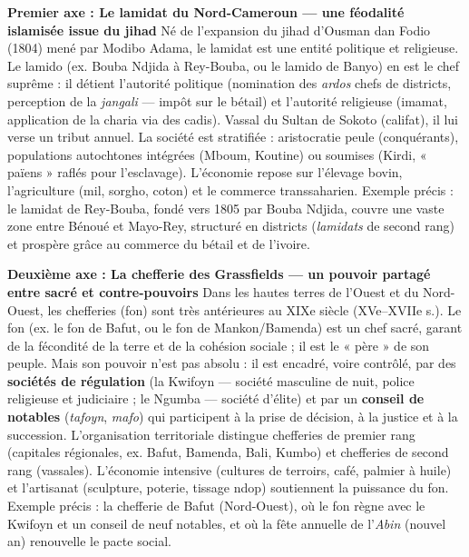 \documentclass[11pt]{article}
\newcommand{\cle}[1]{{\popxbold\color{popdark}#1}}
\begin{document}
\begin{corrige}
\textbf{Premier axe : Le lamidat du Nord-Cameroun — une féodalité islamisée issue du jihad}
Né de l'expansion du jihad d'Ousman dan Fodio (1804) mené par Modibo Adama, le lamidat est une entité politique et religieuse. Le \cle{lamido} (ex. Bouba Ndjida à Rey-Bouba, ou le lamido de Banyo) en est le chef suprême : il détient l'autorité politique (nomination des \emph{ardos} chefs de districts, perception de la \emph{jangali} — impôt sur le bétail) et l'autorité religieuse (imamat, application de la charia via des cadis). Vassal du Sultan de Sokoto (califat), il lui verse un tribut annuel. La société est stratifiée : aristocratie peule (conquérants), populations autochtones intégrées (Mboum, Koutine) ou soumises (Kirdi, « païens » raflés pour l'esclavage). L'économie repose sur l'élevage bovin, l'agriculture (mil, sorgho, coton) et le commerce transsaharien. Exemple précis : le lamidat de \cle{Rey-Bouba}, fondé vers 1805 par Bouba Ndjida, couvre une vaste zone entre Bénoué et Mayo-Rey, structuré en districts (\emph{lamidats} de second rang) et prospère grâce au commerce du bétail et de l'ivoire.

\textbf{Deuxième axe : La chefferie des Grassfields — un pouvoir partagé entre sacré et contre-pouvoirs}
Dans les hautes terres de l'Ouest et du Nord-Ouest, les chefferies (fon) sont très antérieures au XIXe siècle (XVe–XVIIe s.). Le \cle{fon} (ex. le fon de Bafut, ou le fon de Mankon/Bamenda) est un chef sacré, garant de la fécondité de la terre et de la cohésion sociale ; il est le « père » de son peuple. Mais son pouvoir n'est pas absolu : il est encadré, voire contrôlé, par des \textbf{sociétés de régulation} (la \cle{Kwifoyn} — société masculine de nuit, police religieuse et judiciaire ; le \cle{Ngumba} — société d'élite) et par un \textbf{conseil de notables} (\emph{tafoyn}, \emph{mafo}) qui participent à la prise de décision, à la justice et à la succession. L'organisation territoriale distingue chefferies de premier rang (capitales régionales, ex. Bafut, Bamenda, Bali, Kumbo) et chefferies de second rang (vassales). L'économie intensive (cultures de terroirs, café, palmier à huile) et l'artisanat (sculpture, poterie, tissage ndop) soutiennent la puissance du fon. Exemple précis : la chefferie de \cle{Bafut} (Nord-Ouest), où le fon règne avec le Kwifoyn et un conseil de neuf notables, et où la fête annuelle de l'\emph{Abin} (nouvel an) renouvelle le pacte social.


\end{corrige}
\end{document}
